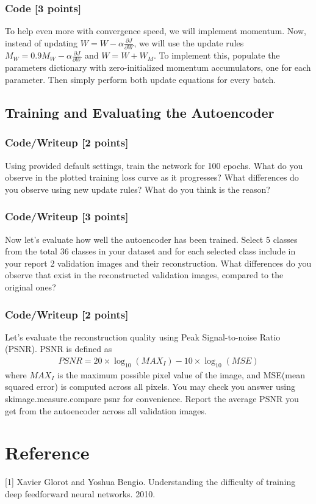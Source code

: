 \documentclass[a4 paper]{article}
\numberwithin{equation}{section}
\newcommand{\der}[2]{\frac{\partial #1}{\partial #2}}
\newcommand{\0}{\mathbf{0}}
\begin{document}
        \subsubsection{Code [3 points]}
        To help even more with convergence speed, we will implement momentum. Now, instead of updating $W = W- \alpha \der{J}{W}$, we will use the update rules $M_W = 0.9M_W - \alpha \der{J}{W}$ and $W = W+W_M$. To implement this, populate the parameters dictionary with zero-initialized momentum accumulators, one for each parameter. Then simply perform both update equations for every batch.
        
    \subsection{Training and Evaluating the Autoencoder}
        \subsubsection{Code/Writeup [2 points]}
        Using provided default settings, train the network for 100 epochs. What do you observe in the plotted training loss curve as it progresses? What differences do you observe using new update rules? What do you think is the reason?
    
        \subsubsection{Code/Writeup [3 points]}
        Now let’s evaluate how well the autoencoder has been trained. Select 5 classes from the total 36 classes in your dataset and for each selected class include in your report 2 validation images and their reconstruction. What differences do you observe that exist in the reconstructed validation images, compared to the original ones?
   
        \subsubsection{Code/Writeup [2 points]}
        Let's evaluate the reconstruction quality using Peak Signal-to-noise Ratio (PSNR). PSNR is defined as
        \begin{align*}
            PSNR = 20 \times \log_{10} (MAX_I) - 10 \times \log_{10} (MSE)
        \end{align*}
        where $MAX_I$ is the maximum possible pixel value of the image, and MSE(mean squared error) is computed across all pixels. You may check you answer using skimage.measure.compare psnr for convenience. Report the average PSNR you get from the autoencoder across all validation images.
        
        
        
\newpage
\section*{Reference}
[1] Xavier Glorot and Yoshua Bengio. Understanding the difficulty of training deep feedforward neural networks. 2010.
\end{document}
